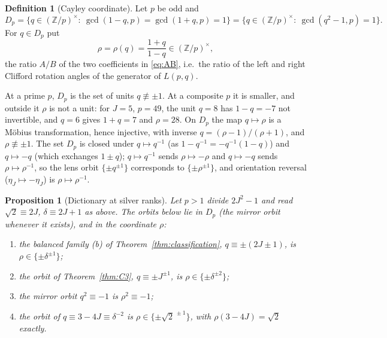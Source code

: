 \documentclass[11pt]{article}
\newtheorem{proposition}[theorem]{Proposition}
\theoremstyle{definition}
\newtheorem{definition}[theorem]{Definition}
\newcommand{\Z}{\mathbb Z}
\begin{document}
\begin{definition}[Cayley coordinate]
\label{def:cayley}
Let $p$ be odd and
\[
 D_p=\{q\in(\Z/p)^\times:\ \gcd(1-q,p)=\gcd(1+q,p)=1\}
 =\{q\in(\Z/p)^\times:\ \gcd(q^2-1,p)=1\}.
\]
For $q\in D_p$ put
\begin{equation}
 \rho=\rho(q)=\frac{1+q}{1-q}\in(\Z/p)^\times ,
 \label{eq:cayley}
\end{equation}
the ratio $A/B$ of the two coefficients in \eqref{eq:AB}, i.e.\ the
ratio of the left and right Clifford rotation angles of the generator of
$L(p,q)$.
\end{definition}

At a prime $p$, $D_p$ is the set of units $q\not\equiv\pm1$.  At a
composite $p$ it is smaller, and outside it $\rho$ is not a unit: for
$J=5$, $p=49$, the unit $q=8$ has $1-q=-7$ not invertible, and $q=6$ gives
$1+q=7$ and $\rho=28$.  On
$D_p$ the map $q\mapsto\rho$ is a M\"obius transformation, hence
injective, with inverse $q=(\rho-1)/(\rho+1)$, and $\rho\not\equiv\pm1$.
The set $D_p$ is closed under $q\mapsto q^{-1}$ (as
$1-q^{-1}=-q^{-1}(1-q)$) and $q\mapsto-q$ (which exchanges $1\pm q$);
$q\mapsto q^{-1}$ sends $\rho\mapsto-\rho$ and $q\mapsto-q$ sends
$\rho\mapsto\rho^{-1}$, so the lens orbit $\{\pm q^{\pm1}\}$ corresponds
to $\{\pm\rho^{\pm1}\}$, and orientation reversal ($\eta_J\mapsto-\eta_J$)
is $\rho\mapsto\rho^{-1}$.

\begin{proposition}[Dictionary at silver ranks]
\label{prop:cayley-dictionary}
Let $p>1$ divide $2J^2-1$ and read $\sqrt2\equiv2J$, $\delta\equiv2J+1$
as above.  The orbits below lie in $D_p$ (the mirror orbit whenever it
exists), and in the coordinate $\rho$:
\begin{enumerate}[label=(\alph*)]
\item the balanced family (b) of Theorem~\ref{thm:classification},
$q\equiv\pm(2J\pm1)$, is $\rho\in\{\pm\delta^{\pm1}\}$;
\item the orbit of Theorem~\ref{thm:C3}, $q\equiv\pm J^{\pm1}$, is
$\rho\in\{\pm\delta^{\pm2}\}$;
\item the mirror orbit $q^2\equiv-1$ is $\rho^2\equiv-1$;
\item the orbit of $q\equiv3-4J\equiv\delta^{-2}$ is
$\rho\in\{\pm\sqrt2^{\,\pm1}\}$, with $\rho(3-4J)=\sqrt2$ exactly.
\end{enumerate}
\end{proposition}
\end{document}
